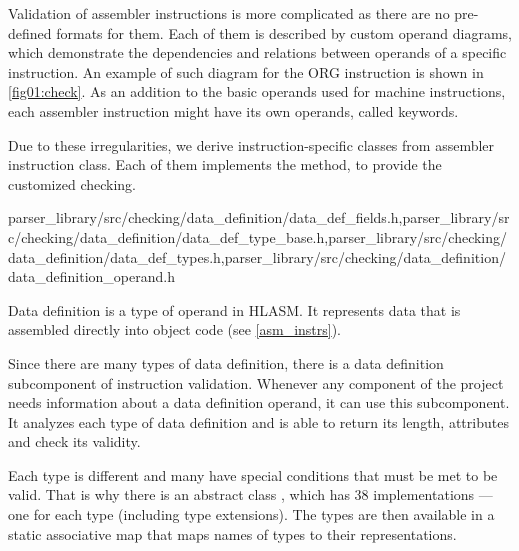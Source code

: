 Validation of assembler instructions is more complicated as there are no pre-defined formats for them. Each of them is described by custom operand diagrams, which demonstrate the dependencies and relations between operands of a specific instruction. An example of such diagram for the ORG instruction is shown in \cref{fig01:check}. As an addition to the basic operands used for machine instructions, each assembler instruction might have its own operands, called keywords.

Due to these irregularities, we derive instruction-specific classes from assembler instruction class. Each of them implements the  method, to provide the customized checking.

{parser\_library/src/checking/data\_definition/data\_def\_fields.h,parser\_library/src/checking/data\_definition/data\_def\_type\_base.h,parser\_library/src/checking/data\_definition/data\_def\_types.h,parser\_library/src/checking/data\_definition/data\_definition\_operand.h}

Data definition is a type of operand in HLASM. It represents data that is assembled directly into object code (see \cref{asm_instrs}).

Since there are many types of data definition, there is a data definition subcomponent of instruction validation. Whenever any component of the project needs information about a data definition operand, it can use this subcomponent. It analyzes each type of data definition and is able to return its length, attributes and check its validity.

Each type is different and many have special conditions that must be met to be valid. That is why there is an abstract class , which has 38 implementations --- one for each type (including type extensions). The types are then available in a static associative map that maps names of types to their representations.

